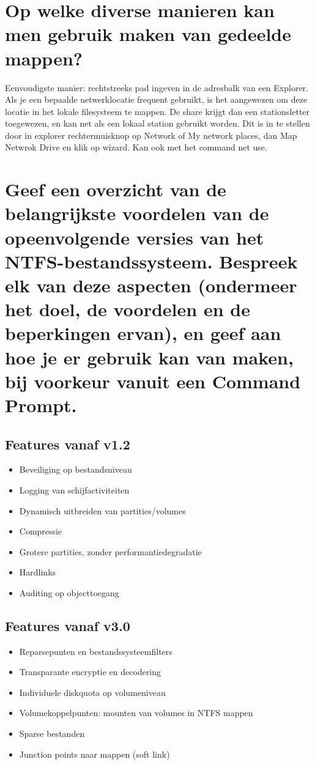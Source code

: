 \section{Op welke diverse manieren kan men gebruik maken van gedeelde mappen?}

Eenvoudigste manier: rechtstreeks pad ingeven in de adresbalk van een Explorer.
Als je een bepaalde netwerklocatie frequent gebruikt, is het aangewezen om deze
locatie in het lokale filesysteem te mappen. De share krijgt dan een
stationsletter toegewezen, en kan net als een lokaal station gebruikt worden.
Dit is in te stellen door in explorer rechtermuisknop op Network of My network
places, dan Map Netwrok Drive en klik op wizard. Kan ook met het command net
use.

\section{Geef een overzicht van de belangrijkste voordelen van de opeenvolgende
versies van het NTFS-bestandssysteem. Bespreek elk van deze aspecten (ondermeer
het doel, de voordelen en de beperkingen ervan), en geef aan hoe je er gebruik
kan van maken, bij voorkeur vanuit een Command Prompt.}

\subsection{Features vanaf v1.2}

\begin{itemize}
	\item Beveiliging op bestandsniveau
	\item Logging van schijfactiviteiten
	\item Dynamisch uitbreiden van partities/volumes
	\item Compressie
	\item Grotere partities, zonder performantiedegradatie
	\item Hardlinks
	\item Auditing op objecttoegang
\end{itemize}

\subsection{Features vanaf v3.0}

\begin{itemize}
	\item Reparsepunten en bestandssysteemfilters
	\item Transparante encryptie en decodering
	\item Individuele diskquota op volumeniveau
	\item Volumekoppelpunten: mounten van volumes in NTFS mappen
	\item Sparse bestanden
	\item Junction points naar mappen (soft link)
\end{itemize}
